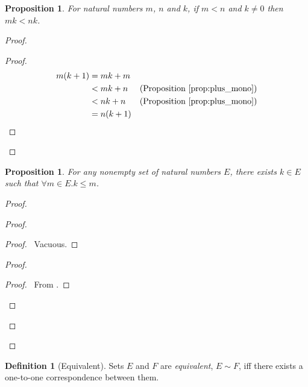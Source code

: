 \documentclass{report}
\let\qed\relax
\newtheorem{prop}[ax]{Proposition}
\theoremstyle{definition}
\newtheorem{df}[ax]{Definition}
\begin{document}
\begin{prop}
For natural numbers $m$, $n$ and $k$, if $m < n$ and $k \neq 0$ then $mk < nk$.
\end{prop}

\begin{proof}
\pf
{}
\begin{proof}
	\pf
	\begin{align*}
		m(k+1) & = mk + m \\
		& < mk + n & (\text{Proposition \ref{prop:plus_mono}}) \\
		& < nk + n & (\text{Proposition \ref{prop:plus_mono}}) \\
		& = n(k+1)
	\end{align*}
\end{proof}
\qed
\end{proof}

\begin{prop}
For any nonempty set of natural numbers $E$, there exists $k \in E$ such that $\forall m \in E. k \leq m$.
\end{prop}

\begin{proof}
\pf
{}
\begin{proof}
	\begin{proof}
		\pf\ Vacuous.
	\end{proof}
	\begin{proof}
		\begin{proof}
			\pf\ From .
		\end{proof}
	\end{proof}
\end{proof}
\qed
\end{proof}

\begin{df}[Equivalent]
Sets $E$ and $F$ are \emph{equivalent}, $E \sim F$, iff there exists a one-to-one correspondence between them.
\end{df}
\end{document}
